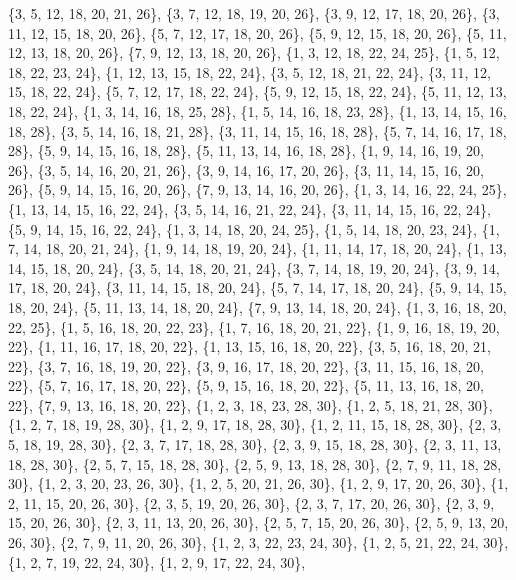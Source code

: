 \documentclass[11pt,a4paper]{article}
\begin{document}
{\{3, 5, 12, 18, 20, 21, 26\}, \{3, 7, 12, 18, 19, 20, 26\}, \{3, 9, 12, 17, 18, 20, 26\}, \{3, 11, 12, 15, 18, 20, 26\}, \{5, 7, 12, 17, 18, 20, 26\},
\{5, 9, 12, 15, 18, 20, 26\}, \{5, 11, 12, 13, 18, 20, 26\}, \{7, 9, 12, 13, 18, 20, 26\}, \{1, 3, 12, 18, 22, 24, 25\}, \{1, 5, 12, 18, 22, 23, 24\},
\{1, 12, 13, 15, 18, 22, 24\}, \{3, 5, 12, 18, 21, 22, 24\}, \{3, 11, 12, 15, 18, 22, 24\}, \{5, 7, 12, 17, 18, 22, 24\}, \{5, 9, 12, 15, 18, 22, 24\},
\{5, 11, 12, 13, 18, 22, 24\}, \{1, 3, 14, 16, 18, 25, 28\}, \{1, 5, 14, 16, 18, 23, 28\}, \{1, 13, 14, 15, 16, 18, 28\}, \{3, 5, 14, 16, 18, 21, 28\},
\{3, 11, 14, 15, 16, 18, 28\}, \{5, 7, 14, 16, 17, 18, 28\}, \{5, 9, 14, 15, 16, 18, 28\}, \{5, 11, 13, 14, 16, 18, 28\}, \{1, 9, 14, 16, 19, 20, 26\},
\{3, 5, 14, 16, 20, 21, 26\}, \{3, 9, 14, 16, 17, 20, 26\}, \{3, 11, 14, 15, 16, 20, 26\}, \{5, 9, 14, 15, 16, 20, 26\}, \{7, 9, 13, 14, 16, 20, 26\},
\{1, 3, 14, 16, 22, 24, 25\}, \{1, 13, 14, 15, 16, 22, 24\}, \{3, 5, 14, 16, 21, 22, 24\}, \{3, 11, 14, 15, 16, 22, 24\}, \{5, 9, 14, 15, 16, 22, 24\},
\{1, 3, 14, 18, 20, 24, 25\}, \{1, 5, 14, 18, 20, 23, 24\}, \{1, 7, 14, 18, 20, 21, 24\}, \{1, 9, 14, 18, 19, 20, 24\}, \{1, 11, 14, 17, 18, 20, 24\},
\{1, 13, 14, 15, 18, 20, 24\}, \{3, 5, 14, 18, 20, 21, 24\}, \{3, 7, 14, 18, 19, 20, 24\}, \{3, 9, 14, 17, 18, 20, 24\}, \{3, 11, 14, 15, 18, 20, 24\},
\{5, 7, 14, 17, 18, 20, 24\}, \{5, 9, 14, 15, 18, 20, 24\}, \{5, 11, 13, 14, 18, 20, 24\}, \{7, 9, 13, 14, 18, 20, 24\}, \{1, 3, 16, 18, 20, 22, 25\},
\{1, 5, 16, 18, 20, 22, 23\}, \{1, 7, 16, 18, 20, 21, 22\}, \{1, 9, 16, 18, 19, 20, 22\}, \{1, 11, 16, 17, 18, 20, 22\}, \{1, 13, 15, 16, 18, 20, 22\},
\{3, 5, 16, 18, 20, 21, 22\}, \{3, 7, 16, 18, 19, 20, 22\}, \{3, 9, 16, 17, 18, 20, 22\}, \{3, 11, 15, 16, 18, 20, 22\}, \{5, 7, 16, 17, 18, 20, 22\},
\{5, 9, 15, 16, 18, 20, 22\}, \{5, 11, 13, 16, 18, 20, 22\}, \{7, 9, 13, 16, 18, 20, 22\}, \{1, 2, 3, 18, 23, 28, 30\}, \{1, 2, 5, 18, 21, 28, 30\},
\{1, 2, 7, 18, 19, 28, 30\}, \{1, 2, 9, 17, 18, 28, 30\}, \{1, 2, 11, 15, 18, 28, 30\}, \{2, 3, 5, 18, 19, 28, 30\}, \{2, 3, 7, 17, 18, 28, 30\},
\{2, 3, 9, 15, 18, 28, 30\}, \{2, 3, 11, 13, 18, 28, 30\}, \{2, 5, 7, 15, 18, 28, 30\}, \{2, 5, 9, 13, 18, 28, 30\}, \{2, 7, 9, 11, 18, 28, 30\},
\{1, 2, 3, 20, 23, 26, 30\}, \{1, 2, 5, 20, 21, 26, 30\}, \{1, 2, 9, 17, 20, 26, 30\}, \{1, 2, 11, 15, 20, 26, 30\}, \{2, 3, 5, 19, 20, 26, 30\},
\{2, 3, 7, 17, 20, 26, 30\}, \{2, 3, 9, 15, 20, 26, 30\}, \{2, 3, 11, 13, 20, 26, 30\}, \{2, 5, 7, 15, 20, 26, 30\}, \{2, 5, 9, 13, 20, 26, 30\},
\{2, 7, 9, 11, 20, 26, 30\}, \{1, 2, 3, 22, 23, 24, 30\}, \{1, 2, 5, 21, 22, 24, 30\}, \{1, 2, 7, 19, 22, 24, 30\}, \{1, 2, 9, 17, 22, 24, 30\},
}
\end{document}
